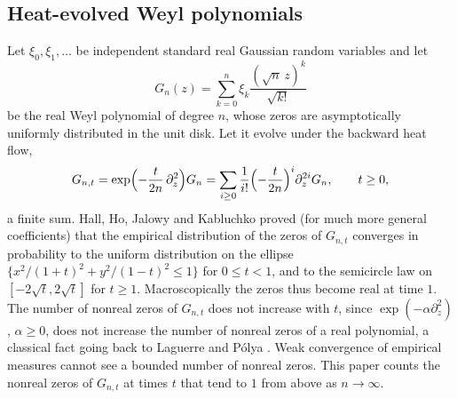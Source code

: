 \documentclass[11pt]{amsart}
\theoremstyle{definition}
\theoremstyle{remark}
\numberwithin{equation}{section}
\begin{document}
\subsection{Heat-evolved Weyl polynomials}
Let $\xi_0,\xi_1,\dots$ be independent standard real Gaussian random variables and let
\begin{equation}\label{eq:weyl}
G_n(z)=\sum_{k=0}^{n}\xi_k\frac{(\sqrt n\,z)^k}{\sqrt{k!}}
\end{equation}
be the real Weyl polynomial of degree $n$, whose zeros are asymptotically uniformly distributed in the unit disk. Let it evolve under the backward heat flow,
\begin{equation}\label{eq:heat}
G_{n,t}=\exp\Bigl(-\frac{t}{2n}\,\partial_z^2\Bigr)G_n=\sum_{i\ge0}\frac1{i!}\Bigl(-\frac{t}{2n}\Bigr)^{i}\partial_z^{2i}G_n,\qquad t\ge0,
\end{equation}
a finite sum. Hall, Ho, Jalowy and Kabluchko \cite[Theorem~2.1]{HHJK} proved (for much more general coefficients) that the empirical distribution of the zeros of $G_{n,t}$ converges in probability to the uniform distribution on the ellipse $\{x^2/(1+t)^2+y^2/(1-t)^2\le1\}$ for $0\le t<1$, and to the semicircle law on $[-2\sqrt t,2\sqrt t]$ for $t\ge1$. Macroscopically the zeros thus become real at time $1$. The number of nonreal zeros of $G_{n,t}$ does not increase with $t$, since $\exp(-\alpha\partial_z^2)$, $\alpha\ge0$, does not increase the number of nonreal zeros of a real polynomial, a classical fact going back to Laguerre and P\'olya \cite[Lemma~\ref{M-lem:heat}(b)]{Main}. Weak convergence of empirical measures cannot see a bounded number of nonreal zeros. This paper counts the nonreal zeros of $G_{n,t}$ at times $t$ that tend to $1$ from above as $n\to\infty$.
\end{document}
